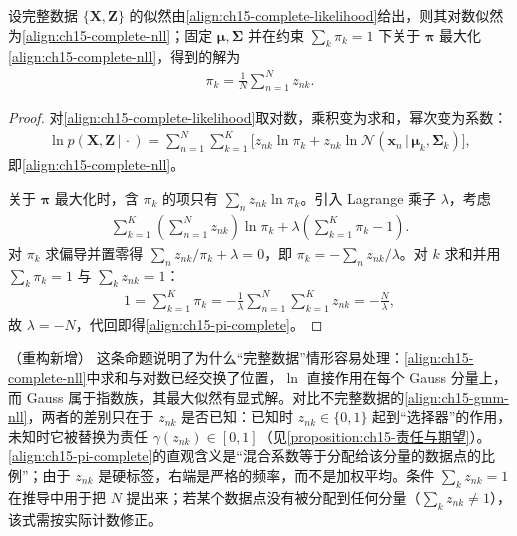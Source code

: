 \documentclass[../../main.tex]{subfiles}
\begin{document}
\begin{proposition}[完全数据的对数似然与混合系数的更新]\label{proposition:ch15-完全数据对数似然}
设完整数据 $\{\bm{X},\bm{Z}\}$ 的似然由\eqref{align:ch15-complete-likelihood}给出，则其对数似然为\eqref{align:ch15-complete-nll}；固定 $\bm{\mu},\bm{\Sigma}$ 并在约束 $\sum_k\pi_k=1$ 下关于 $\bm{\pi}$ 最大化\eqref{align:ch15-complete-nll}，得到的解为
\begin{align}
\pi_k=\frac{1}{N}\sum_{n=1}^{N}z_{nk}.
\label{align:ch15-pi-complete}
\end{align}
\end{proposition}
\begin{proof}
对\eqref{align:ch15-complete-likelihood}取对数，乘积变为求和，幂次变为系数：
\begin{align*}
\ln p(\bm{X},\bm{Z}\,|\,\cdot)=\sum_{n=1}^{N}\sum_{k=1}^{K}\Big[z_{nk}\ln\pi_k+z_{nk}\ln\mathcal{N}(\bm{x}_n\,|\,\bm{\mu}_k,\bm{\Sigma}_k)\Big],
\end{align*}
即\eqref{align:ch15-complete-nll}。

关于 $\bm{\pi}$ 最大化时，含 $\pi_k$ 的项只有 $\sum_n z_{nk}\ln\pi_k$。引入 Lagrange 乘子 $\lambda$，考虑
\begin{align*}
\sum_{k=1}^{K}\left(\sum_{n=1}^{N}z_{nk}\right)\ln\pi_k+\lambda\left(\sum_{k=1}^{K}\pi_k-1\right).
\end{align*}
对 $\pi_k$ 求偏导并置零得 $\sum_n z_{nk}/\pi_k+\lambda=0$，即 $\pi_k=-\sum_n z_{nk}/\lambda$。对 $k$ 求和并用 $\sum_k\pi_k=1$ 与 $\sum_kz_{nk}=1$：
\begin{align*}
1=\sum_{k=1}^{K}\pi_k=-\frac{1}{\lambda}\sum_{n=1}^{N}\sum_{k=1}^{K}z_{nk}=-\frac{N}{\lambda},
\end{align*}
故 $\lambda=-N$，代回即得\eqref{align:ch15-pi-complete}。
\end{proof}

\begin{remark}（重构新增）
这条命题说明了为什么“完整数据”情形容易处理：\eqref{align:ch15-complete-nll}中求和与对数已经交换了位置，$\ln$ 直接作用在每个 Gauss 分量上，而 Gauss 属于指数族，其最大似然有显式解。对比不完整数据的\eqref{align:ch15-gmm-nll}，两者的差别只在于 $z_{nk}$ 是否已知：已知时 $z_{nk}\in\{0,1\}$ 起到“选择器”的作用，未知时它被替换为责任 $\gamma(z_{nk})\in[0,1]$（见\cref{proposition:ch15-责任与期望}）。\eqref{align:ch15-pi-complete}的直观含义是“混合系数等于分配给该分量的数据点的比例”；由于 $z_{nk}$ 是硬标签，右端是严格的频率，而不是加权平均。条件 $\sum_kz_{nk}=1$ 在推导中用于把 $N$ 提出来；若某个数据点没有被分配到任何分量（$\sum_kz_{nk}\neq1$），该式需按实际计数修正。
\end{remark}
\end{document}
